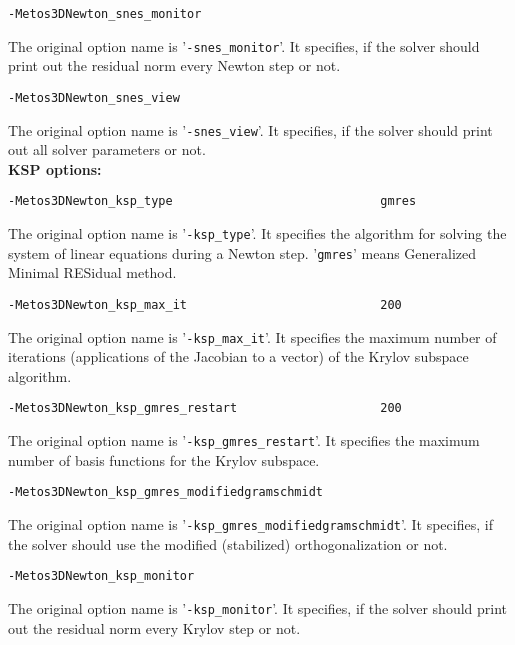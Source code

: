 \documentclass{article}
\begin{document}
\begin{verbatim}
-Metos3DNewton_snes_monitor
\end{verbatim}
The original option name is '\texttt{-snes\_monitor}'. It specifies,
if the solver should print out the residual norm every Newton step or not.

\begin{verbatim}
-Metos3DNewton_snes_view
\end{verbatim}
The original option name is '\texttt{-snes\_view}'. It specifies,
if the solver should print out all solver parameters or not. \\

\textbf{KSP options:}

\begin{verbatim}
-Metos3DNewton_ksp_type                             gmres
\end{verbatim}
The original option name is '\texttt{-ksp\_type}'. It specifies the
algorithm for solving the system of linear equations during a
Newton step. '\texttt{gmres}' means Generalized Minimal RESidual method.

\begin{verbatim}
-Metos3DNewton_ksp_max_it                           200
\end{verbatim}
The original option name is '\texttt{-ksp\_max\_it}'. 
It specifies the maximum number of iterations (applications of the
Jacobian to a vector) of the Krylov subspace algorithm.

\begin{verbatim}
-Metos3DNewton_ksp_gmres_restart                    200
\end{verbatim}
The original option name is '\texttt{-ksp\_gmres\_restart}'.
It specifies the maximum number of basis functions for the Krylov subspace.

\begin{verbatim}
-Metos3DNewton_ksp_gmres_modifiedgramschmidt
\end{verbatim}
The original option name is '\texttt{-ksp\_gmres\_modifiedgramschmidt}'.
It specifies, if the solver should use the modified (stabilized) orthogonalization or not.

\begin{verbatim}
-Metos3DNewton_ksp_monitor
\end{verbatim}
The original option name is '\texttt{-ksp\_monitor}'.
It specifies,
if the solver should print out the residual norm every Krylov step or not.

%
%

%

\end{document}
